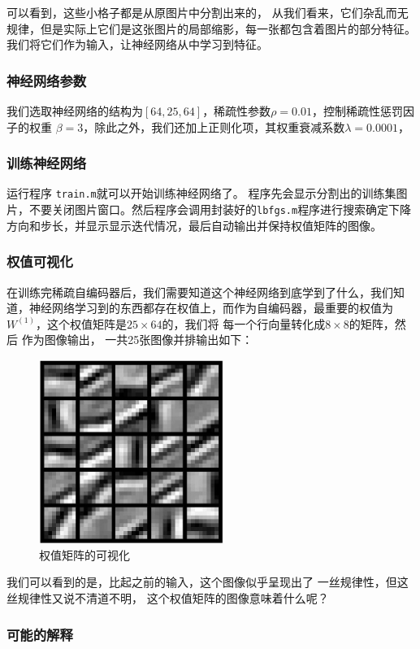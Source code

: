 可以看到，这些小格子都是从原图片中分割出来的，
从我们看来，它们杂乱而无规律，但是实际上它们是这张图片的局部缩影，每一张都包含着图片的部分特征。我们将它们作为输入，让神经网络从中学习到特征。

\subsubsection*{神经网络参数}
我们选取神经网络的结构为$[64,25,64]$，稀疏性参数$\rho=0.01$，控制稀疏性惩罚因子的权重 $ \beta =3$，除此之外，我们还加上正则化项，其权重衰减系数$\lambda=0.0001$，

\subsubsection*{训练神经网络}
运行程序 \verb|train.m|就可以开始训练神经网络了。
程序先会显示分割出的训练集图片，不要关闭图片窗口。然后程序会调用封装好的\verb|lbfgs.m|程序进行搜索确定下降方向和步长，并显示显示迭代情况，最后自动输出并保持权值矩阵的图像。

\subsubsection*{权值可视化}
在训练完稀疏自编码器后，我们需要知道这个神经网络到底学到了什么，我们知道，神经网络学习到的东西都存在权值上，而作为自编码器，最重要的权值为$W^{(1)}$，这个权值矩阵是$25\times 64$的，我们将
每一个行向量转化成$8\times8$的矩阵，然后
作为图像输出， 一共25张图像并排输出如下：

\begin{figure}[H]
\centering
\includegraphics[width=6cm]{fig/s3.jpg}
\caption{权值矩阵的可视化}
\end{figure}

我们可以看到的是，比起之前的输入，这个图像似乎呈现出了
一丝规律性，但这丝规律性又说不清道不明，
这个权值矩阵的图像意味着什么呢？
\subsubsection*{可能的解释}


